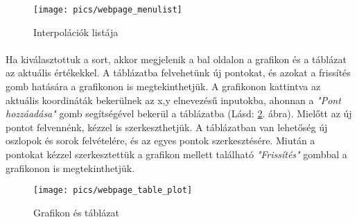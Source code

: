 	\begin{figure}[h]
		\texttt{[image: pics/webpage\_menulist]}
		\centering
		\caption{Interpolációk listája\label{fig:webpage_menulist}}
	\end{figure}
	
	\paragraph{}
	Ha kiválasztottuk a sort, akkor megjelenik a bal oldalon a grafikon és a táblázat az aktuális értékekkel. A táblázatba felvehetünk új pontokat, és azokat a frissítés gomb hatására a grafikonon is megtekinthetjük. A grafikonon kattintva az aktuális koordináták bekerülnek az x,y elnevezésű inputokba, ahonnan a \textit{"Pont hozzáadása"} gomb segítségével bekerül a táblázatba (Lásd: \ref{fig:webpage_table_plot}. ábra). Mielőtt az új pontot felvennénk, kézzel is szerkeszthetjük. A táblázatban van lehetőség új oszlopok és sorok felvételére, és az egyes pontok szerkesztésére. Miután a pontokat kézzel szerkesztettük a grafikon mellett található \textit{"Frissítés"} gombbal a grafikonon is megtekinthetjük.

	\begin{figure}[h]
		\texttt{[image: pics/webpage\_table\_plot]}
		\centering
		\caption{Grafikon és táblázat\label{fig:webpage_table_plot}}
	\end{figure}

